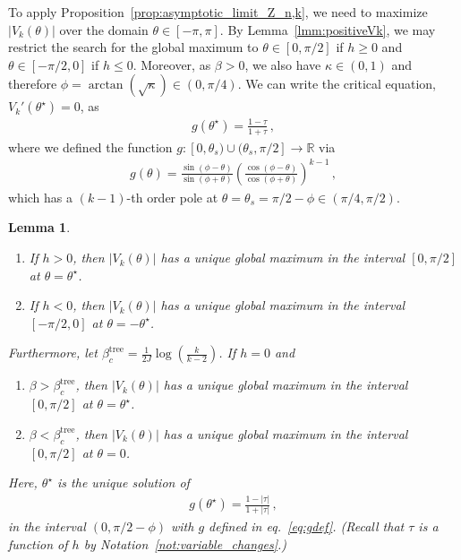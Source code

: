 \documentclass{article}
\numberwithin{theorem}{section}
\newtheorem{lemma}[theorem]{Lemma}
\theoremstyle{remark}
\newcommand{\RR}{\mathbb{R}}
\begin{document}
To apply Proposition~\ref{prop:asymptotic_limit_Z_n,k}, we need to maximize $|V_k(\theta)|$ over the domain $\theta \in [-\pi,\pi]$.
By Lemma~\ref{lmm:positiveVk}, we may restrict the search for the global maximum to $\theta \in [0,\pi/2]$ if $h \geq 0$ and $\theta \in [-\pi/2,0]$ if $h \leq 0$.
Moreover, as $\beta > 0$, we also have $\kappa \in (0,1)$ and therefore $\phi=\arctan(\sqrt{\kappa}) \in (0,\pi/4)$.
We can write the critical equation, $V_k'(\theta^\star) = 0$, as
\begin{align}
  \label{eq:crit}
  g(\theta^\star) = \frac{1-\tau}{1+\tau}\, ,
\end{align}
where we defined the function $g:[0,\theta_s) \cup (\theta_s,\pi/2] \rightarrow \RR$ via
\begin{align}
  \label{eq:gdef}
  g(\theta) = \frac{\sin(\phi-\theta)}{\sin(\phi+\theta)} \left( \frac{\cos(\phi-\theta)}{\cos(\phi+\theta)} \right)^{k-1}\,,
\end{align}
which has a $(k-1)$-th order pole at $\theta= \theta_s = \pi/2-\phi \in (\pi/4,\pi/2)$.

\begin{lemma}\mbox{}
  \label{lem:maximum}
  \begin{enumerate}
    \item If $h > 0$, then $|V_k(\theta)|$ has a unique global maximum in the interval $[0,\pi/2]$ at $\theta= \theta^\star$.
    \item If $h < 0$, then $|V_k(\theta)|$ has a unique global maximum in the interval $[-\pi/2,0]$ at $\theta=-\theta^\star$.
  \end{enumerate}

  Furthermore, let $\beta_c^{\mathrm{tree}} = \frac{1}{2J}\log(\frac{k}{k-2})$.  If $h =0$ and
  \begin{enumerate}
    \item[3.] $\beta > \beta_c^{\mathrm{tree}}$, then $|V_k(\theta)|$ has a unique global maximum in the interval $[0,\pi/2]$ at $\theta = \theta^\star$.
    \item[4.] $\beta < \beta_c^{\mathrm{tree}}$, then $|V_k(\theta)|$ has a unique global maximum in the interval $[0,\pi/2]$ at $\theta = 0$.
  \end{enumerate}

  Here, $\theta^\star$ is the unique solution of 
  \begin{align}
    g(\theta^\star) = \frac{1-|\tau|}{1+|\tau|}\, ,
  \end{align}
  in the interval $(0,\pi/2-\phi)$ with $g$ defined in eq.~\eqref{eq:gdef}.
  (Recall that $\tau$ is a function of $h$ by Notation~\ref{not:variable_changes}.)
\end{lemma}
\end{document}
